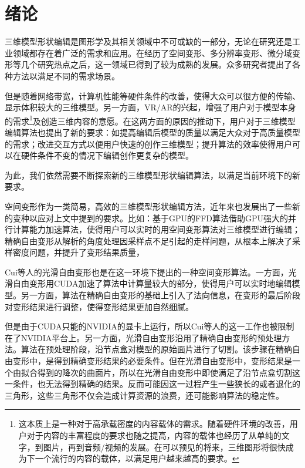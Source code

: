
\chapter{绪论}

    三维模型形状编辑是图形学及其相关领域中不可或缺的一部分，无论在研究还是工业领域都存在着广泛的需求和应用。在经历了空间变形、多分辨率变形、微分域变形等几个研究热点之后，这一领域已得到了较为成熟的发展。众多研究者提出了各种方法以满足不同的需求场景。

    但是随着网络带宽，计算机性能等硬件条件的改善，使得大众可以很方便的传输、显示体积较大的三维模型。另一方面，VR/AR的兴起，增强了用户对于模型本身的需求\footnote{这本质上是一种对于高承载密度的内容载体的需求。随着硬件环境的改善，用户对于内容的丰富程度的要求也随之提高，内容的载体也经历了从单纯的文字，到图片，再到音频/视频的发展。在可以预见的将来，三维图形将很快成为下一个流行的内容的载体，以满足用户越来越高的要求。}及创造三维内容的意愿。在这两方面的原因的推动下，用户对于三维模型编辑算法也提出了新的要求：如提高编辑后模型的质量以满足大众对于高质量模型的需求；改进交互方式以便用户快速的创作三维模型；提升算法的效率使得用户可以在硬件条件不变的情况下编辑创作更复杂的模型。

    为此，我们依然需要不断探索新的三维模型形状编辑算法，以满足当前环境下的新要求。

    空间变形作为一类简易，高效的三维模型形状编辑方法，近年来也发展出了一些新的变种以应对上文中提到的要求。比如：基于GPU的FFD算法\cite{chua2000, modat2010}借助GPU强大的并行计算能力加速算法，使得用户可以实时的用空间变形算法对三维模型进行编辑；精确自由变形\cite{Feng98, Feng00}从解析的角度处理因采样点不足引起的走样问题，从根本上解决了采样密度问题，并提升了变形结果质量，

    Cui等人的光滑自由变形\cite{Cui15}也是在这一环境下提出的一种空间变形算法。一方面，光滑自由变形用CUDA加速了算法中计算量较大的部分，使得用户可以实时地编辑模型。另一方面，算法在精确自由变形\cite{Feng98}的基础上引入了法向信息，在变形的最后阶段对变形结果进行调整，使得变形结果更加自然细腻。

    但是由于CUDA只能的NVIDIA的显卡上运行，所以Cui等人的这一工作也被限制在了NVIDIA平台上。另一方面，光滑自由变形沿用了精确自由变形\cite{Feng98, Feng00}的预处理方法。算法在预处理阶段，沿节点盒对模型的原始面片进行了切割。该步骤在精确自由变形中，是得到精确变形结果的必要条件。但在光滑自由变形中，变形结果是一个由拟合得到的降次的曲面片，所以在光滑自由变形中即使满足了沿节点盒切割这一条件，也无法得到精确的结果。反而可能因这一过程产生一些狭长的或者退化的三角形，这些三角形不仅会造成计算资源的浪费，还可能影响算法的稳定性。

